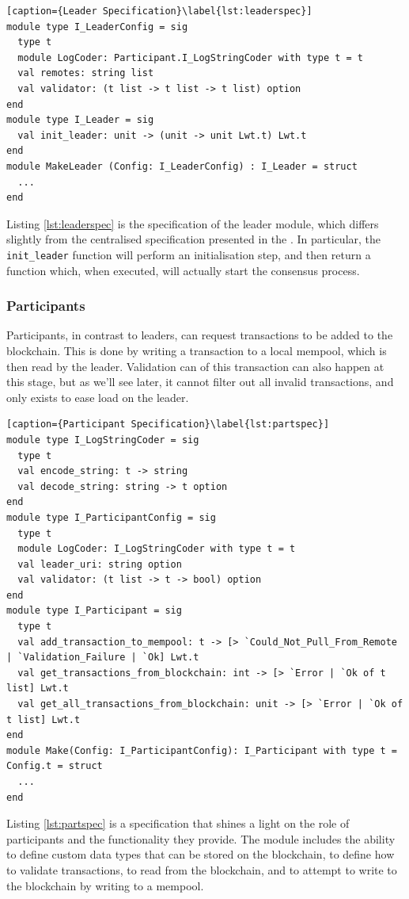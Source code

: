 \documentclass[12pt,a4paper,twoside,openright]{report}
\begin{document}
			\begin{lstlisting}[caption={Leader Specification}\label{lst:leaderspec}]
module type I_LeaderConfig = sig
  type t
  module LogCoder: Participant.I_LogStringCoder with type t = t    
  val remotes: string list
  val validator: (t list -> t list -> t list) option
end
module type I_Leader = sig
  val init_leader: unit -> (unit -> unit Lwt.t) Lwt.t
end
module MakeLeader (Config: I_LeaderConfig) : I_Leader = struct
  ...
end
			\end{lstlisting}

			Listing \ref{lst:leaderspec} is the specification of the leader module, which differs slightly from the centralised specification presented in the .
			In particular, the \texttt{init\_leader} function will perform an initialisation step, and then return a function which, when executed, will actually start the consensus process.

			\subsubsection*{Participants}
			Participants, in contrast to leaders, can request transactions to be added to the blockchain. 
			This is done by writing a transaction to a local mempool, which is then read by the leader.
			Validation can of this transaction can also happen at this stage, but as we'll see later, it cannot filter out all invalid transactions, and only exists to ease load on the leader.\\

			\begin{lstlisting}[caption={Participant Specification}\label{lst:partspec}]
module type I_LogStringCoder = sig
  type t
  val encode_string: t -> string
  val decode_string: string -> t option
end
module type I_ParticipantConfig = sig
  type t
  module LogCoder: I_LogStringCoder with type t = t
  val leader_uri: string option
  val validator: (t list -> t -> bool) option
end
module type I_Participant = sig
  type t
  val add_transaction_to_mempool: t -> [> `Could_Not_Pull_From_Remote | `Validation_Failure | `Ok] Lwt.t
  val get_transactions_from_blockchain: int -> [> `Error | `Ok of t list] Lwt.t
  val get_all_transactions_from_blockchain: unit -> [> `Error | `Ok of t list] Lwt.t
end
module Make(Config: I_ParticipantConfig): I_Participant with type t = Config.t = struct
  ...
end
			\end{lstlisting}

			Listing \ref{lst:partspec} is a specification that shines a light on the role of participants and the functionality they provide.
			The module includes the ability to define custom data types that can be stored on the blockchain, to define how to validate transactions, to read from the blockchain, and to attempt to write to the blockchain by writing to a mempool.
\end{document}
